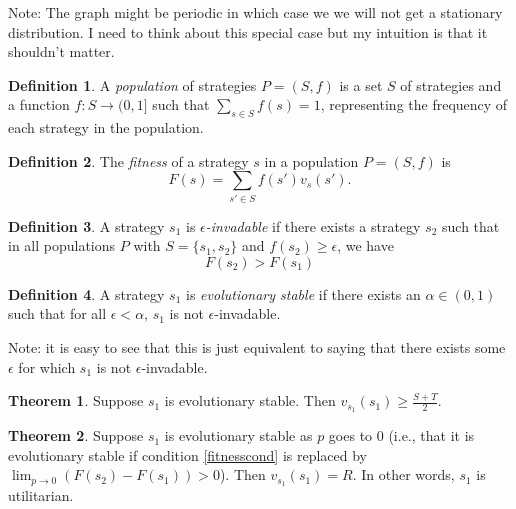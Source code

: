 \documentclass[11pt]{amsart}
\theoremstyle{definition}
\newtheorem{definition}{Definition}
\newtheorem{theorem}{Theorem}
\theoremstyle{remark}
\begin{document}
Note: The graph might be periodic in which case we we will not get a stationary distribution. I need to think about this special case but my intuition is that it shouldn't matter.

\begin{definition}
  A \textit{population} of strategies $P = (S, f)$ is a set $S$ of strategies and a function $f : S \to (0,1]$ such that $\sum_{s \in S} f(s) = 1$, representing the frequency of each strategy in the population.
\end{definition}

\begin{definition}
  The \textit{fitness} of a strategy $s$ in a population $P = (S, f)$ is \begin{equation*}
    F(s) = \sum_{s' \in S} f(s') v_s(s').
  \end{equation*}
\end{definition}

\begin{definition}
  A strategy $s_1$ is \textit{$\epsilon$-invadable} if there exists a strategy $s_2$ such that in all populations $P$ with $S = \{s_1,s_2\}$ and $f(s_2) \geq \epsilon$, we have \begin{equation}
    \label{fitnesscond}
    F(s_2) > F(s_1)
  \end{equation}
\end{definition}

\begin{definition}
  A strategy $s_1$ is \textit{evolutionary stable} if there exists an $\alpha \in (0,1)$ such that for all $\epsilon < \alpha$, $s_1$ is not $\epsilon$-invadable.
\end{definition}

Note: it is easy to see that this is just equivalent to saying that there exists some $\epsilon$ for which $s_1$ is not $\epsilon$-invadable.

\begin{theorem}
  \label{evolutionarystable1}
  Suppose $s_1$ is evolutionary stable. Then $v_{s_1}(s_1) \geq \frac{S + T}{2}$.
\end{theorem}

\begin{theorem}
  \label{evolutionarystable2}
  Suppose $s_1$ is evolutionary stable as $p$ goes to 0 (i.e., that it is evolutionary stable if condition \ref{fitnesscond} is replaced by $\lim_{p \to 0} (F (s_2)-F(s_1)) > 0$). Then $v_{s_1}(s_1) = R$. In other words, $s_1$ is utilitarian.
\end{theorem}
\end{document}
